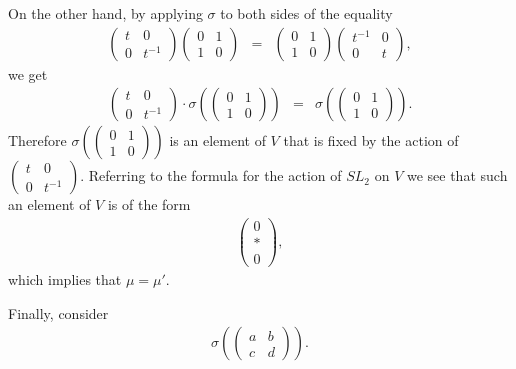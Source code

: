 On the other hand, by applying $\sigma$ to both sides of the equality
\begin{eqnarray*}
\left(\begin{matrix} t & 0 \\ 0 & t^{-1} \end{matrix}\right)
\left(\begin{matrix} 0 & 1 \\ 1 & 0 \end{matrix}\right) &=&
\left(\begin{matrix} 0 & 1 \\ 1 & 0 \end{matrix}\right)
\left(\begin{matrix} t^{-1} & 0 \\ 0 & t \end{matrix}\right),
\end{eqnarray*} 
we get
\begin{eqnarray*}
\left(\begin{matrix} t & 0 \\ 0 & t^{-1} \end{matrix}\right) \cdot
\sigma\left(
\left(\begin{matrix} 0 & 1 \\ 1 & 0 \end{matrix}\right)
\right) &=&
\sigma\left(
\left(\begin{matrix} 0 & 1 \\ 1 & 0 \end{matrix}\right)
\right).
\end{eqnarray*}
Therefore $\sigma\left(
\left(\begin{matrix} 0 & 1 \\ 1 & 0 \end{matrix}\right)
\right)$ is an element of $V$ that is fixed by the action of $\left(\begin{matrix} t & 0 \\ 0 & t^{-1} \end{matrix}\right)$. Referring to the formula for the action of $SL_2$ on $V$ we see that such an element of $V$ is of the form
\begin{eqnarray*}
\left(\begin{matrix} 0 \\ * \\ 0 \end{matrix}\right),
\end{eqnarray*}
which implies that $\mu = \mu'$.

Finally, consider
\begin{eqnarray*}
\sigma\left(
\left(\begin{matrix}a & b \\ c & d\end{matrix}\right)
\right).
\end{eqnarray*}

